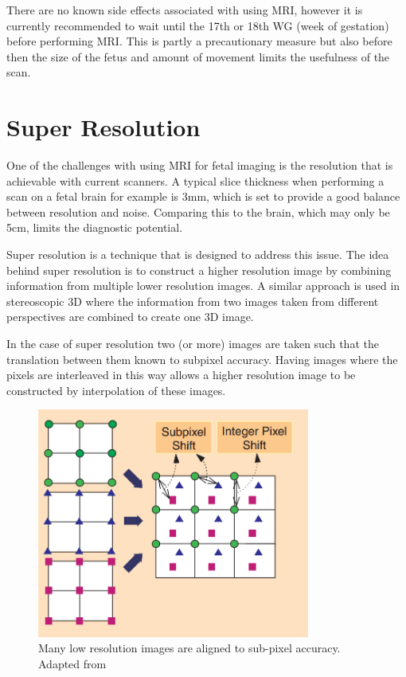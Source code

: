 There are no known side effects associated with using MRI, however it is currently recommended to wait until the 17th or 18th WG (week of gestation) before performing MRI. This is partly a precautionary measure but also before then the size of the fetus and amount of movement limits the usefulness of the scan.

\newpage
\section{Super Resolution}
\cite{superresolution1}\cite{superresolution2}
One of the challenges with using MRI for fetal imaging is the resolution that is achievable with current scanners. A typical slice thickness when performing a scan on a fetal brain for example is 3mm, which is set to provide a good balance between resolution and noise. Comparing this to the brain, which may only be 5cm, limits the diagnostic potential.

Super resolution is a technique that is designed to address this issue. The idea behind super resolution is to construct a higher resolution image by combining information from multiple lower resolution images. A similar approach is used in stereoscopic 3D where the information from two images taken from different perspectives are combined to create one 3D image.

In the case of super resolution two (or more) images are taken such that the translation between them known to subpixel accuracy. Having images where the pixels are interleaved in this way allows a higher resolution image to be constructed by interpolation of these images.

\begin{figure}[h]
    \centering
	\includegraphics[width=0.8\textwidth]{images/super_resolution.png}
    \caption{Many low resolution images are aligned to sub-pixel accuracy. Adapted from \cite{superresolution2}}
    \label{fig:superresolution}
\end{figure}

